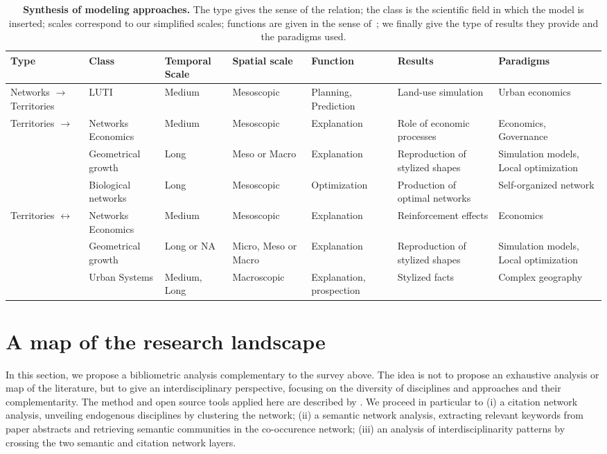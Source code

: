 \documentclass[10pt]{article}
\begin{document}
\begin{table}%
\caption{\textbf{Synthesis of modeling approaches.} The type gives the sense of the relation; the class is the scientific field in which the model is inserted; scales correspond to our simplified scales; functions are given in the sense of~\cite{varenne2017theories}; we finally give the type of results they provide and the paradigms used.\label{tab:synthesis}}
\medskip
\begin{tabular}{|p{2.5cm}|p{2cm}|p{2.5cm}|p{2.5cm}|p{2.1cm}|p{2.2cm}|p{2cm}|}
\hline
Type & Class & Temporal Scale & Spatial scale & Function & Results & Paradigms\\ \hline
Networks $\rightarrow$ Territories & LUTI & Medium & Mesoscopic & Planning, Prediction & Land-use simulation & Urban economics \\ \hline
\multirow{3}{*}{Territories $\rightarrow$}& Networks Economics & Medium & Mesoscopic & Explanation & Role of economic processes & Economics, Governance\\\cline{2-7}
Networks& Geometrical growth & Long & Meso or Macro & Explanation & Reproduction of stylized shapes & Simulation models, Local optimization \\\cline{2-7}
& Biological networks & Long & Mesoscopic & Optimization & Production of optimal networks & Self-organized network \\ \hline
\multirow{2}{*}{Territories $\leftrightarrow$}& Networks Economics & Medium & Mesoscopic & Explanation & Reinforcement effects & Economics\\\cline{2-7}
Networks & Geometrical growth & Long or NA & Micro, Meso or Macro & Explanation & Reproduction of stylized shapes & Simulation models, Local optimization \\\cline{2-7}
& Urban Systems & Medium, Long & Macroscopic & Explanation, prospection & Stylized facts & Complex geography\\\hline
\end{tabular}
\end{table}



\section{A map of the research landscape}

In this section, we propose a bibliometric analysis complementary to the survey above. The idea is not to propose an exhaustive analysis or map of the literature, but to give an interdisciplinary perspective, focusing on the diversity of disciplines and approaches and their complementarity. The method and open source tools applied here are described by \cite{raimbault2019exploration}. We proceed in particular to (i) a citation network analysis, unveiling endogenous disciplines by clustering the network; (ii) a semantic network analysis, extracting relevant keywords from paper abstracts and retrieving semantic communities in the co-occurence network; (iii) an analysis of interdisciplinarity patterns by crossing the two semantic and citation network layers.
\end{document}
